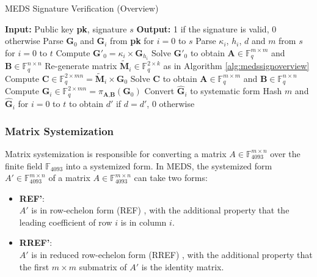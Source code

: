 \documentclass[11pt,a4paper]{report}
\theoremstyle{definition}
\begin{document}
\begin{algorithm}
  \caption{MEDS Signature Verification (Overview)}
  \label{alg:medsverifyoverview}
  \begin{algorithmic}[1]
    \State \textbf{Input:} Public key \textbf{pk}, signature $s$
    \State \textbf{Output:} 1 if the signature is valid, 0 otherwise
    \State Parse $\textbf{G}_0$ and $\textbf{G}_i$ from \textbf{pk} for $i = 0$ to $s$
    \State Parse $\kappa_i$, $h_i$, $d$ and $m$ from $s$ for $i = 0$ to $t$
        \State Compute $\textbf{G}'_{0} = \kappa_i \times \textbf{G}_{h_i}$
        \State Solve $\textbf{G}'_{0}$ to obtain $\textbf{A} \in \mathbb{F}_q^{m \times m}$ and $\textbf{B} \in \mathbb{F}_q^{n \times n}$
      \Else
        \State Re-generate matrix $\tilde{\textbf{M}}_i \in \mathbb{F}_q^{2 \times k}$ as in Algorithm \ref{alg:medssignoverview}
        \State Compute $\textbf{C} \in \mathbb{F}_q^{2 \times mn} = \tilde{\textbf{M}}_i \times \textbf{G}_0$
        \State Solve $\textbf{C}$ to obtain $\textbf{A} \in \mathbb{F}_q^{m \times m}$ and $\textbf{B} \in \mathbb{F}_q^{n \times n}$
      \EndIf
      \State Compute $\hat{\textbf{G}}_i \in \mathbb{F}_q^{2 \times mn} = \pi_{\textbf{A}, \textbf{B}}(\textbf{G}_0)$
      \State Convert $\hat{\textbf{G}}_i$ to systematic form
    \EndFor
    \State Hash $m$ and $\hat{\textbf{G}}_i$ for $i = 0$ to $t$ to obtain $d'$
    \State {} if $d = d'$, 0 otherwise
  \end{algorithmic}
\end{algorithm}

\subsubsection{Matrix Systemization}
\label{sec:systemization}
Matrix systemization is responsible for converting a matrix $A \in \mathbb{F}_{4093}^{m \times n}$ over the finite field $\mathbb{F}_{4093}$ into a systemized form. In MEDS, the systemized form $A' \in \mathbb{F}_{4093}^{m \times n}$ of a matrix $A \in \mathbb{F}_{4093}^{m \times n}$ can take two forms:
\begin{itemize}
  \item \textbf{REF'}:\\
  $A'$ is in row-echelon form (REF) \cite{leon2006linear}, with the additional property that the leading coefficient of row $i$ is in column $i$.
  \item \textbf{RREF'}:\\
  $A'$ is in reduced row-echelon form (RREF) \cite{leon2006linear}, with the additional property that the first $m \times m$ submatrix of $A'$ is the identity matrix.
\end{itemize}
\end{document}
